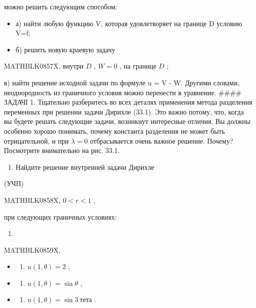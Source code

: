 \documentclass[
  ukrainian,
]{article}
\providecommand{\tightlist}{%
  \setlength{\itemsep}{0pt}\setlength{\parskip}{0pt}}
\begin{document}
можно решить следующим способом:

\begin{itemize}
\tightlist
\item
  а) найти любую функцию V, которая удовлетворяет на границе D условию
  V=f;
\item
  б) решить новую краевую задачу
\end{itemize}

MATHBLK0857X, внутри \(D\) , \(W = 0\) , на границе \(D\) ;

в) найти решение исходной задачи по формуле u = V - W. Другими словами,
неоднородность из граничного условия можно перенести в уравнение.
\#\#\#\# ЗАДАЧІ 1. Тщательно разберитесь во всех деталях применения
метода разделения переменных при решении задачи Дирихле (33.1). Это
важно потому, что, когда вы будете решать следующие задачи, возникнут
интересные отличия. Вы должны особенно хорошо понимать, почему константа
разделения не может быть отрицательной, и при \(\lambda=0\)
отбрасывается очень важное решение. Почему? Посмотрите внимательно на
рис. 33.1.

\begin{enumerate}
\def\labelenumi{\arabic{enumi}.}
\setcounter{enumi}{1}
\tightlist
\item
  Найдите решение внутренней задачи Дирихле
\end{enumerate}

(УЧП)

MATHBLK0858X, \(0 < r < 1\) ,

при следующих граничных условиях:

\begin{enumerate}
\def\labelenumi{\alph{enumi})}
\tightlist
\item
\end{enumerate}

MATHBLK0859X,

\begin{itemize}
\tightlist
\item
  \begin{enumerate}
  \def\labelenumi{\arabic{enumi})}
  \setcounter{enumi}{5}
  \tightlist
  \item
    \(u(1, \theta) = 2\) ,
  \end{enumerate}
\item
  \begin{enumerate}
  \def\labelenumi{\Alph{enumi})}
  \setcounter{enumi}{1}
  \tightlist
  \item
    \(u(1, \theta) = \sin \theta\) ,
  \end{enumerate}
\item
  \begin{enumerate}
  \def\labelenumi{\alph{enumi})}
  \setcounter{enumi}{17}
  \tightlist
  \item
    \(u(1, \theta) = \sin 3\ тета\) .
  \end{enumerate}
\end{itemize}
\end{document}
